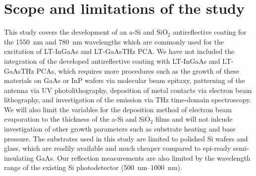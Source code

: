 \section{Scope and limitations of the study}\label{sec: sco}

This study covers the development of an \gls{a-Si} and SiO$_2$ antireflective coating for the \qty{1550}{\nano\meter} and \qty{780}{\nano\meter} wavelengths which are commonly used for the excitation of \gls{LT}-InGaAs and \gls{LT}-GaAsTHz \gls{PCA}. We have not included the integration of the developed antireflective coating with \gls{LT}-InGaAs and \gls{LT}-GaAsTHz \gls{PCA}s, which requires more procedures such as the growth of these materials on GaAs or InP wafers via molecular beam epitaxy, patterning of the antenna via UV photolithography, deposition of metal contacts via electron beam lithography, and investigation of the emission via THz time-domain spectroscopy. We will also limit the variables for the deposition method of electron beam evaporation to the thickness of the \gls{a-Si} and SiO$_2$ films and will not inlcude investigation of other growth parameters such as substrate heating and base pressure. The substrates used in this study are limited to polished Si wafers and glass, which are readily available and much cheaper compared to epi-ready semi-insulating GaAs. Our reflection measurements are also limited by the wavelength range of the existing Si photodetector (\qtyrange{500}{1000}{\nano\meter}).
